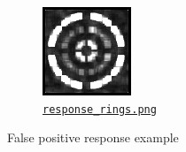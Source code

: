 \begin{figure}[htbp]
\begin{subfigure}[t]{0.4\textwidth}
		\includegraphics[width=\textwidth]{hw2/problem3/response_rings.png}
		\caption{\href{./hw2/problem3/response_rings.png}{\texttt{response\_rings.png}}}\label{fig:6b}
	\end{subfigure}
	\caption{False positive response example}\label{fig:6}
\end{figure}


